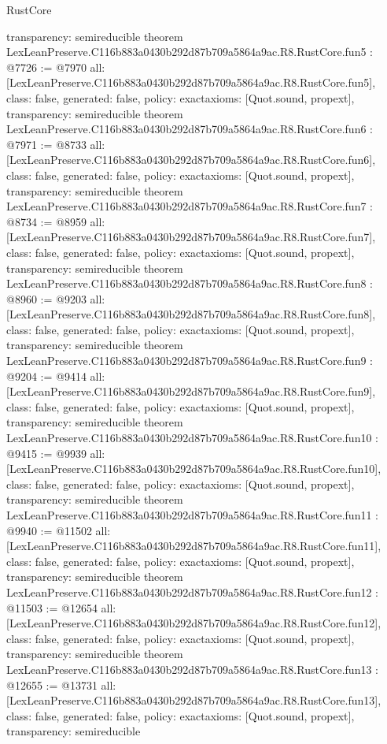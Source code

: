 \begin{lexlean}{RustCore}
\begin{coremodule}
{  transparency: semireducible
}
theorem LexLeanPreserve.C116b883a0430b292d87b709a5864a9ac.R8.RustCore.fun5 : @7726 := @7970 {
  all: [LexLeanPreserve.C116b883a0430b292d87b709a5864a9ac.R8.RustCore.fun5],
  class: false,
  generated: false,
  policy: exact{axioms: [Quot.sound, propext]},
  transparency: semireducible
}
theorem LexLeanPreserve.C116b883a0430b292d87b709a5864a9ac.R8.RustCore.fun6 : @7971 := @8733 {
  all: [LexLeanPreserve.C116b883a0430b292d87b709a5864a9ac.R8.RustCore.fun6],
  class: false,
  generated: false,
  policy: exact{axioms: [Quot.sound, propext]},
  transparency: semireducible
}
theorem LexLeanPreserve.C116b883a0430b292d87b709a5864a9ac.R8.RustCore.fun7 : @8734 := @8959 {
  all: [LexLeanPreserve.C116b883a0430b292d87b709a5864a9ac.R8.RustCore.fun7],
  class: false,
  generated: false,
  policy: exact{axioms: [Quot.sound, propext]},
  transparency: semireducible
}
theorem LexLeanPreserve.C116b883a0430b292d87b709a5864a9ac.R8.RustCore.fun8 : @8960 := @9203 {
  all: [LexLeanPreserve.C116b883a0430b292d87b709a5864a9ac.R8.RustCore.fun8],
  class: false,
  generated: false,
  policy: exact{axioms: [Quot.sound, propext]},
  transparency: semireducible
}
theorem LexLeanPreserve.C116b883a0430b292d87b709a5864a9ac.R8.RustCore.fun9 : @9204 := @9414 {
  all: [LexLeanPreserve.C116b883a0430b292d87b709a5864a9ac.R8.RustCore.fun9],
  class: false,
  generated: false,
  policy: exact{axioms: [Quot.sound, propext]},
  transparency: semireducible
}
theorem LexLeanPreserve.C116b883a0430b292d87b709a5864a9ac.R8.RustCore.fun10 : @9415 := @9939 {
  all: [LexLeanPreserve.C116b883a0430b292d87b709a5864a9ac.R8.RustCore.fun10],
  class: false,
  generated: false,
  policy: exact{axioms: [Quot.sound, propext]},
  transparency: semireducible
}
theorem LexLeanPreserve.C116b883a0430b292d87b709a5864a9ac.R8.RustCore.fun11 : @9940 := @11502 {
  all: [LexLeanPreserve.C116b883a0430b292d87b709a5864a9ac.R8.RustCore.fun11],
  class: false,
  generated: false,
  policy: exact{axioms: [Quot.sound, propext]},
  transparency: semireducible
}
theorem LexLeanPreserve.C116b883a0430b292d87b709a5864a9ac.R8.RustCore.fun12 : @11503 := @12654 {
  all: [LexLeanPreserve.C116b883a0430b292d87b709a5864a9ac.R8.RustCore.fun12],
  class: false,
  generated: false,
  policy: exact{axioms: [Quot.sound, propext]},
  transparency: semireducible
}
theorem LexLeanPreserve.C116b883a0430b292d87b709a5864a9ac.R8.RustCore.fun13 : @12655 := @13731 {
  all: [LexLeanPreserve.C116b883a0430b292d87b709a5864a9ac.R8.RustCore.fun13],
  class: false,
  generated: false,
  policy: exact{axioms: [Quot.sound, propext]},
  transparency: semireducible
}
\end{coremodule}
\end{lexlean}
